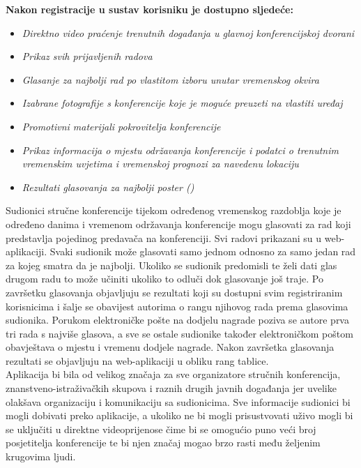         \textbf{Nakon registracije u sustav korisniku je dostupno sljedeće:}
        \begin{itemize}
        	\item \textit{Direktno video praćenje trenutnih događanja u glavnoj konferencijskoj dvorani}
        	\item \textit{Prikaz svih prijavljenih radova}
        	\item \textit{Glasanje za najbolji rad po vlastitom izboru unutar vremenskog okvira}
        	\item \textit{Izabrane fotografije s konferencije koje je moguće preuzeti na vlastiti uređaj}
        	\item \textit{Promotivni materijali pokrovitelja konferencije}
        	\item \textit{Prikaz informacija o mjestu održavanja konferencije i podatci o trenutnim vremenskim uvjetima i vremenskoj prognozi za navedenu lokaciju}
        	\item \textit{Rezultati glasovanja za najbolji poster ()}
        \end{itemize}

		Sudionici stručne konferencije tijekom određenog vremenskog razdoblja koje je određeno danima i vremenom održavanja konferencije mogu glasovati za rad koji predstavlja pojedinog predavača na konferenciji. Svi radovi prikazani su u web-aplikaciji. Svaki sudionik može glasovati samo jednom odnosno za samo jedan rad za kojeg smatra da je najbolji. Ukoliko se sudionik predomisli te želi dati glas drugom radu to može učiniti ukoliko to odluči dok glasovanje još traje. Po završetku glasovanja objavljuju se rezultati koji su dostupni svim registriranim korisnicima i šalje se obavijest autorima o rangu njihovog rada prema glasovima sudionika. Porukom elektroničke pošte na dodjelu nagrade poziva se autore prva tri rada s najviše glasova, a sve se ostale sudionike također elektroničkom poštom obavještava o mjestu i vremenu dodjele nagrade. Nakon završetka glasovanja rezultati se objavljuju na web-aplikaciji u obliku rang tablice.\\
		
		Aplikacija bi bila od velikog značaja za sve organizatore stručnih konferencija, znanstveno-istraživačkih skupova i raznih drugih javnih događanja jer uvelike olakšava organizaciju i komunikaciju sa sudionicima. Sve informacije sudionici bi mogli dobivati preko aplikacije, a ukoliko ne bi mogli prisustvovati uživo mogli bi se uključiti u direktne videoprijenose čime bi se omogućio puno veći broj posjetitelja konferencije te bi njen značaj mogao brzo rasti među željenim krugovima ljudi.\\
		
